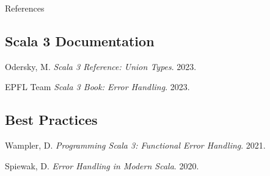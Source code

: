\documentclass{beamer}
\begin{document}
\begin{frame}{References}
\footnotesize

\begin{thebibliography}{9}
\beamertemplatetextbibitems

\subsection*{Scala 3 Documentation}
\textcolor{pureblue}{Odersky, M.} 
\textit{Scala 3 Reference: Union Types}. 2023.

\textcolor{pureblue}{EPFL Team} 
\textit{Scala 3 Book: Error Handling}. 2023.

\subsection*{Best Practices}
\textcolor{pureblue}{Wampler, D.} 
\textit{Programming Scala 3: Functional Error Handling}. 2021.

\textcolor{pureblue}{Spiewak, D.} 
\textit{Error Handling in Modern Scala}. 2020.

\end{thebibliography}

\end{frame}
\end{document}
